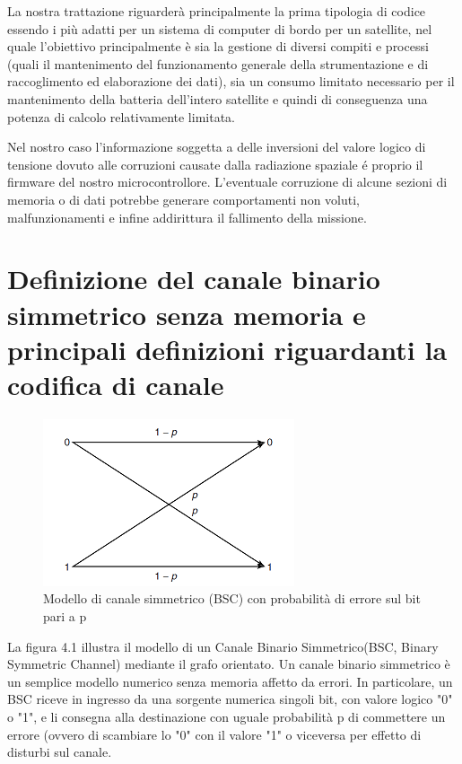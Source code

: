 \documentclass[LaM,binding=0.6cm]{../sapthesis}
\begin{document}
La nostra trattazione riguarderà principalmente la prima tipologia di codice essendo i più adatti per un sistema di computer di bordo per un satellite, nel quale l'obiettivo principalmente è sia la gestione di diversi compiti e processi (quali il mantenimento del funzionamento generale della strumentazione e di raccoglimento ed elaborazione dei dati), sia un consumo limitato necessario per il mantenimento della batteria dell'intero satellite e quindi di conseguenza una potenza di calcolo relativamente limitata.

\newline
Nel nostro caso l'informazione soggetta a delle inversioni del valore logico di tensione dovuto alle corruzioni causate dalla radiazione spaziale é proprio il firmware del nostro microcontrollore.
L'eventuale corruzione di alcune sezioni di memoria o di dati potrebbe generare comportamenti non voluti, malfunzionamenti e infine addirittura il fallimento della missione.

\section{Definizione del canale binario simmetrico senza memoria e principali definizioni riguardanti la codifica di canale}

\begin{figure}[htbp]
\centerline{\includegraphics[scale=0.8]{examples/canale-binario.png}}
\caption{Modello di canale simmetrico (BSC) con probabilità di errore sul bit pari a p}
\label{fig}
\end{figure}
\newline
La figura 4.1 illustra il modello di un Canale Binario Simmetrico(BSC, Binary Symmetric Channel) mediante il grafo orientato. Un canale binario simmetrico è un semplice modello numerico senza memoria affetto da errori. In particolare, un BSC riceve in ingresso da una sorgente numerica singoli bit, con valore logico "0" o "1", e li consegna alla destinazione con uguale probabilità p di commettere un errore (ovvero di scambiare lo "0" con il valore "1" o viceversa per effetto di disturbi sul canale. 
\end{document}
